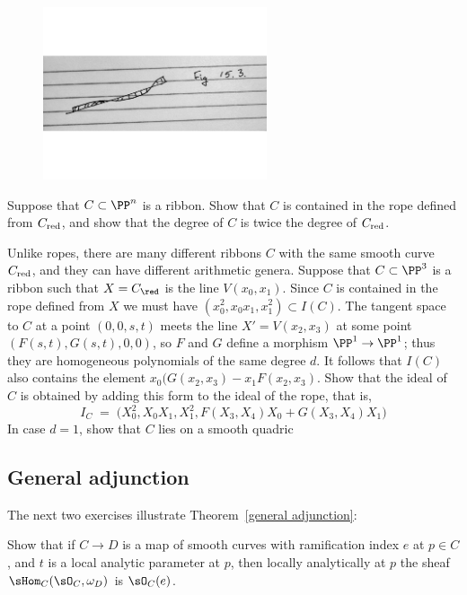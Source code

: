 \begin{figure}
\begin{center}
\centerline {\includegraphics[height=2in]{"Fig15.3.pdf"}}
\caption{}
\label{Fig15.3}
\end{center}
\end{figure}

\begin{exercise}
Suppose that $C\subset \PP^n$ is a ribbon. Show that $C$ is contained in the rope defined
from $C_{\rm red}$, and show that the degree of $C$ is twice the degree of $C_{\rm red}$.
\end{exercise}

Unlike ropes, there are many different ribbons $C$ with the same smooth curve $C_{\rm red}$,
and they can have different arithmetic genera. 
Suppose that $C\subset \PP^3$ is a ribbon such that $X = C_{\red}$ is the line $V(x_0,x_1)$.
Since $C$ is contained in the rope defined from $X$ we must have $(x_0^2, x_0x_1,x_1^2) \subset I(C)$. The tangent space to $C$ at a point $(0,0,s,t)$ meets the line  $X' = V(x_2, x_3)$
at some point $(F(s,t),G(s,t),0,0)$, so $F$ and $G$ define a morphism $\PP^1 \to \PP^1$;
thus they are homogeneous polynomials of the same degree $d$.  It follows that $I(C)$ also contains the element
$x_0(G(x_2, x_3) - x_1F(x_2,x_3)$. Show that the ideal of $C$ is obtained by adding this form to the ideal of the rope, that is,
$$
I_C \; = \; \big(X_0^2, X_0X_1, X_1^2, F(X_3,X_4)X_0 + G(X_3,X_4)X_1\big)
$$
In case $d=1$, show that $C$ lies on a smooth quadric 
\subsection{General adjunction}

The next two exercises illustrate Theorem~\ref{general adjunction}:

\begin{exercise}\label{codimension0}
Show that if $C\to D$ is a map of smooth curves with ramification index $e$ at $p\in C$, and $t$ is a local
analytic parameter at $p$, then 
locally analytically at $p$ the sheaf $\sHom_C(\sO_C, \omega_D)$ is $\sO_C(e)$.
\end{exercise}


